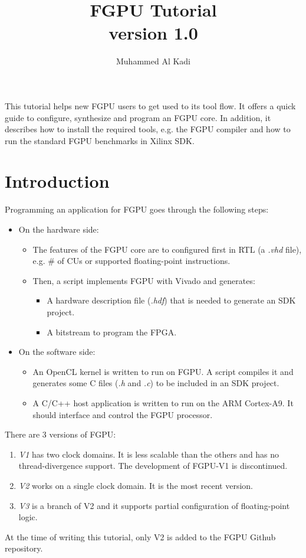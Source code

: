 \documentclass[11pt]{article}
\title{FGPU Tutorial \\ \large version 1.0}
\author{Muhammed Al Kadi}
\begin{document}
\maketitle

This tutorial helps new FGPU users to get used to its tool flow.
It offers a quick guide to configure, synthesize and program an FGPU core.
In addition, it describes how to install the required tools, e.g. the FGPU compiler and how to run the standard FGPU benchmarks in Xilinx SDK.
\section{Introduction}
Programming an application for FGPU goes through the following steps:
\begin{itemize}
  \item On the hardware side:
    \begin{itemize}
      \item The features of the FGPU core are to configured first in RTL (a \emph{.vhd} file), e.g. \# of CUs or 
        supported floating-point instructions.
      \item Then, a script implements FGPU with Vivado and generates:
      \begin{itemize}
        \item A hardware description file (\emph{.hdf}) that is needed to generate an SDK project.
        \item A bitstream to program the FPGA.
      \end{itemize}
    \end{itemize}
  \item On the software side:
    \begin{itemize}
      \item An OpenCL kernel is written to run on FGPU. 
        A script compiles it and generates some C files (\emph{.h} and \emph{.c}) to be included in an SDK project.
      \item A C/C++ host application is written to run on the ARM Cortex-A9.
      It should interface and control the FGPU processor.
    \end{itemize}
\end{itemize}

There are 3 versions of FGPU:
\begin{enumerate}
  \item \emph{V1} has two clock domains. It is less scalable than the others and has no thread-divergence support.
    The development of FGPU-V1 is discontinued.
  \item \emph{V2} works on a single clock domain. It is the most recent version.
  \item \emph{V3} is a branch of V2 and it supports partial configuration of floating-point logic.
\end{enumerate}
At the time of writing this tutorial, only V2 is added to the FGPU Github repository.
\end{document}
